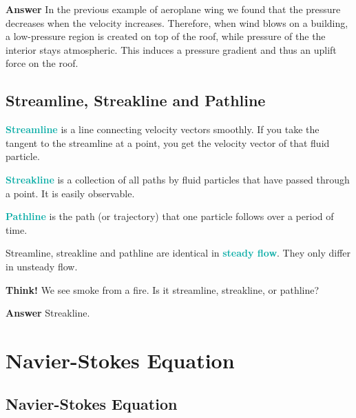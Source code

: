 \documentclass[twoside]{article}
\newcommand{\question}[1]{\begin{questionbox} \emoji{grapes} \textbf{Think!} \newline #1 \end{questionbox}}
\newcommand{\answer}[1]{\begin{answerbox} \emoji{melon} \textbf{Answer} \newline #1 \end{answerbox}}
\newcommand{\highlightbluetext}[1]{\textcolor[HTML]{09ACA6}{\textbf{#1}}}
\numberwithin{equation}{section}
\begin{document}
	\answer{
		In the previous example of aeroplane wing we found that the pressure decreases when the velocity increases. Therefore, when wind blows on a building, a low-pressure region is created on top of the roof, while pressure of the the interior stays atmospheric. This induces a pressure gradient and thus an uplift force on the roof.
	}
	
	\subsection{Streamline, Streakline and Pathline}
	\label{subsec:StreamlineStreaklineAndPathline}
	
	\highlightbluetext{Streamline} is a line connecting velocity vectors smoothly. If you take the tangent to the streamline at a point, you get the velocity vector of that fluid particle.
	
	\highlightbluetext{Streakline} is a collection of all paths by fluid particles that have passed through a point. It is easily observable.
	
	\highlightbluetext{Pathline} is the path (or trajectory) that one particle follows over a period of time.
	
	Streamline, streakline and pathline are identical in \highlightbluetext{steady flow}. They only differ in unsteady flow.
	
	\question{
		We see smoke from a fire. Is it streamline, streakline, or pathline?
	}
	
	\answer{
		Streakline.
	}
	
	\newpage
	
	\section{Navier-Stokes Equation}
	\label{sec:NavierStokesEquation}
	
	\subsection{Navier-Stokes Equation}
	\label{subsec:NavierStokesEquation}
	
\end{document}
